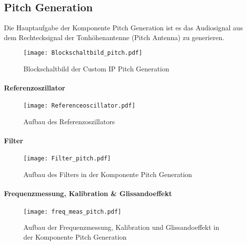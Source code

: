 \subsection{Pitch Generation}\label{subsec:Pitch_Generation}

Die Hauptaufgabe der Komponente Pitch Generation ist es das Audiosignal aus dem Rechtecksignal der Tonhöhenantenne (Pitch Antenna) zu generieren. 


\begin{figure}[h!]
	\centering
	\texttt{[image: Blockschaltbild\_pitch.pdf]}
	\caption{Blockschaltbild der Custom IP Pitch Generation} 
	\label{img:Blockschaltbild_pitch}
\end{figure}  



\paragraph{Referenzoszillator}

\begin{figure}[h!]
	\centering
	\texttt{[image: Referenceoscillator.pdf]}
	\caption{Aufbau des Referenzoszillators} 
	\label{img:Referenceoscillator}
\end{figure}  

\paragraph{Filter}

\begin{figure}[h!]
	\centering
	\texttt{[image: Filter\_pitch.pdf]}
	\caption{Aufbau des Filters in der Komponente Pitch Generation} 
	\label{img:Filter_Pitch}
\end{figure}  

\paragraph{Frequenzmessung, Kalibration \& Glissandoeffekt}

\begin{figure}[h!]
	\centering
	\texttt{[image: freq\_meas\_pitch.pdf]}
	\caption{Aufbau der Frequenzmessung, Kalibration und Glissandoeffekt in der Komponente Pitch Generation} 
	\label{img:freq_meas_pitch}
\end{figure}  